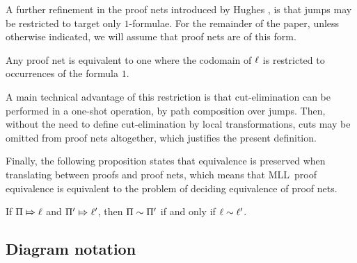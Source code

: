 \documentclass{lmcs}
\let\capsabbrev=\uppercase
\begin{document}
A further refinement in the proof nets introduced by Hughes \cite{Hughes-2012-nets}, is that jumps may be restricted to target only $1$-formulae. For the remainder of the paper, unless otherwise indicated, we will assume that proof nets are of this form.

\begin{proposition}
Any proof net is equivalent to one where the codomain of $\ell$ is restricted to occurrences of the formula $1$.
\end{proposition}

A main technical advantage of this restriction is that cut-elimination can be performed in a one-shot operation, by path composition over jumps. Then, without the need to define cut-elimination by local transformations, cuts may be omitted from proof nets altogether, which justifies the present definition.

Finally, the following proposition states that equivalence is preserved when translating between proofs and proof nets, which means that \capsabbrev{mll}\ proof equivalence is equivalent to the problem of deciding equivalence of proof nets.


\begin{proposition}
\label{prop:proof nets work}
%
If $\Pi\Mapsto\ell$ and $\Pi'\Mapsto\ell'$, then $\Pi\perm\Pi'$ if and only if $\links\perm\links'$.
%
\end{proposition}




\subsection*{Diagram notation}
\end{document}
